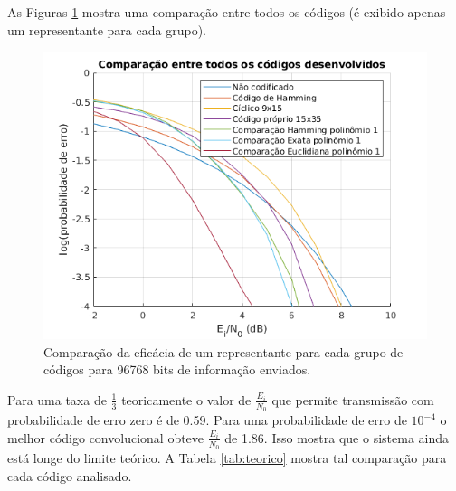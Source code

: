 As Figuras \ref{fig:geral} mostra uma comparação entre todos os códigos (é exibido apenas um representante para cada grupo).

\begin{figure}[ht]
	\centering
	\captionsetup{justification=centering}
	\includegraphics[scale=0.45]{floats/geral.png}
	\caption{\label{fig:geral}Comparação da eficácia de um representante para cada grupo de códigos para 96768 bits de informação enviados.}
\end{figure}

Para uma taxa de $\frac{1}{3}$ teoricamente o valor de $\frac{E_i}{N_0}$ que permite transmissão com probabilidade de erro zero é de 0.59. Para uma probabilidade de erro de $10^{-4}$ o melhor código convolucional obteve $\frac{E_i}{N_0}$ de 1.86. Isso mostra que o sistema ainda está longe do limite teórico. A Tabela \ref{tab:teorico} mostra tal comparação para cada código analisado.

